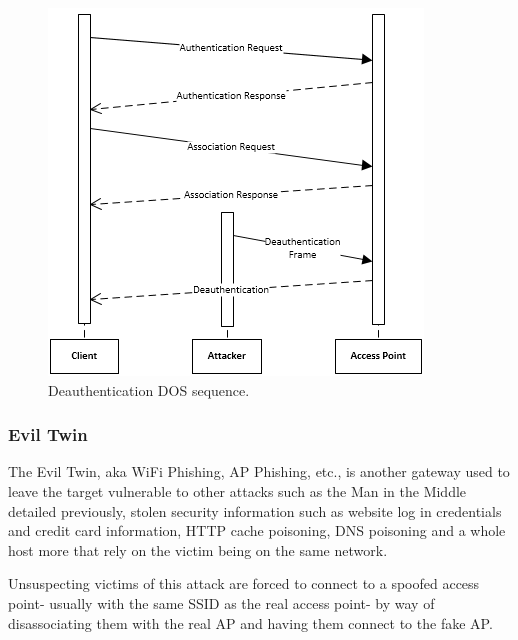 \begin{figure}[h!]
\includegraphics[width=\linewidth]{research/figures/deauthentication.png}
\caption{Deauthentication DOS sequence.}
\end{figure}
\subsubsection{Evil Twin}
The Evil Twin, aka WiFi Phishing, AP Phishing, etc., is another gateway used to leave the target vulnerable to other attacks such as the Man in the Middle detailed previously, stolen security information such as website log in credentials and credit card information, HTTP cache poisoning, DNS poisoning and a whole host more that rely on the victim being on the same network. 

Unsuspecting victims of this attack are forced to connect to a spoofed access point- usually with the same SSID as the real access point- by way of disassociating them with the real AP and having them connect to the fake AP. 

